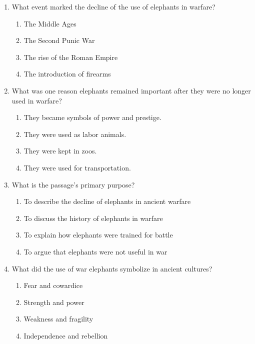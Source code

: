 \documentclass[12pt]{article}
\begin{document}
\begin{enumerate}
    \item What event marked the decline of the use of elephants in warfare?
    \begin{enumerate}[label=\Alph*.]
        \item The Middle Ages
        \item The Second Punic War
        \item The rise of the Roman Empire
        \item The introduction of firearms
    \end{enumerate}
    \vspace{0.5cm}

    \item What was one reason elephants remained important after they were no longer used in warfare?
    \begin{enumerate}[label=\Alph*.]
        \item They became symbols of power and prestige.
        \item They were used as labor animals.
        \item They were kept in zoos.
        \item They were used for transportation.
    \end{enumerate}
    \vspace{0.5cm}

    \item What is the passage’s primary purpose?
    \begin{enumerate}[label=\Alph*.]
        \item To describe the decline of elephants in ancient warfare
        \item To discuss the history of elephants in warfare
        \item To explain how elephants were trained for battle
        \item To argue that elephants were not useful in war
    \end{enumerate}
    \vspace{0.5cm}

    \item What did the use of war elephants symbolize in ancient cultures?
    \begin{enumerate}[label=\Alph*.]
        \item Fear and cowardice
        \item Strength and power
        \item Weakness and fragility
        \item Independence and rebellion
    \end{enumerate}
    \vspace{0.5cm}


\end{enumerate}
\end{document}
